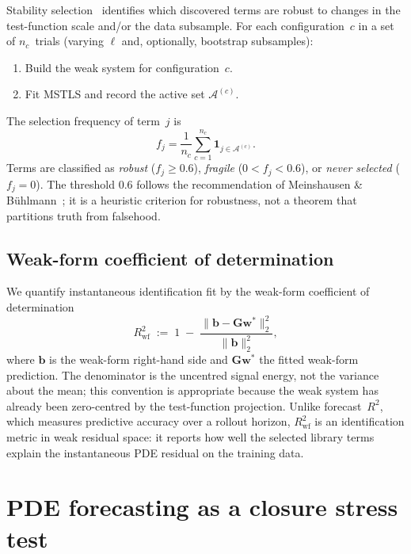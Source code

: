 Stability selection~\cite{meinshausen2010stability} identifies which
discovered terms are robust to changes in the test-function scale and/or
the data subsample.  For each configuration~$c$ in a set of $n_c$~trials
(varying $\boldsymbol\ell$ and, optionally, bootstrap subsamples):
\begin{enumerate}[nosep]
\item Build the weak system for configuration~$c$.
\item Fit MSTLS and record the active set $\mathcal{A}^{(c)}$.
\end{enumerate}
The selection frequency of term~$j$ is
\begin{equation}
  f_j = \frac{1}{n_c}\sum_{c=1}^{n_c}\mathbf{1}_{j\in\mathcal{A}^{(c)}}.
  \label{eq:stability_freq}
\end{equation}
Terms are classified as
\emph{robust} ($f_j\ge 0.6$),
\emph{fragile} ($0<f_j<0.6$), or
\emph{never selected} ($f_j=0$).
The threshold 0.6 follows the recommendation of
Meinshausen \& B\"uhlmann~\cite{meinshausen2010stability}; it is a heuristic
criterion for robustness, not a theorem that partitions truth from falsehood.

\subsection{Weak-form coefficient of determination}
\label{subsec:r2wf}

We quantify instantaneous identification fit by the weak-form coefficient of determination
\begin{equation}
  R^2_{\mathrm{wf}}
  \;:=\;
  1 \;-\;
  \frac{\lVert\mathbf{b} - \mathbf{G}\mathbf{w}^*\rVert_2^2}
       {\lVert\mathbf{b}\rVert_2^2},
  \label{eq:r2wf}
\end{equation}
where $\mathbf{b}$ is the weak-form right-hand side and
$\mathbf{G}\mathbf{w}^*$ the fitted weak-form prediction.
The denominator is the uncentred signal energy, not the variance about
the mean; this convention is appropriate because the weak system has
already been zero-centred by the test-function projection.
Unlike forecast~$R^2$, which measures predictive accuracy over a rollout
horizon, $R^2_{\mathrm{wf}}$ is an identification metric in weak
residual space: it reports how well the selected library terms explain
the instantaneous PDE residual on the training data.

\section{PDE forecasting as a closure stress test}
\label{sec:forecast}

